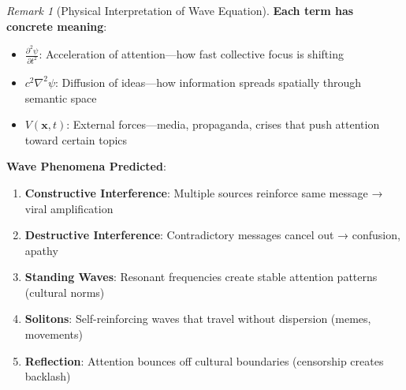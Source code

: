 \documentclass[11pt,a4paper]{article}
\theoremstyle{definition}
\theoremstyle{remark}
\newtheorem{remark}{Remark}[section]
\begin{document}
\begin{remark}[Physical Interpretation of Wave Equation]
\textbf{Each term has concrete meaning}:

\begin{itemize}
    \item \(\frac{\partial^2 \psi}{\partial t^2}\): Acceleration of attention—how fast collective focus is shifting
    \item \(c^2 \nabla^2 \psi\): Diffusion of ideas—how information spreads spatially through semantic space
    \item \(V(\mathbf{x}, t)\): External forces—media, propaganda, crises that push attention toward certain topics
\end{itemize}

\textbf{Wave Phenomena Predicted}:
\begin{enumerate}
    \item \textbf{Constructive Interference}: Multiple sources reinforce same message → viral amplification
    \item \textbf{Destructive Interference}: Contradictory messages cancel out → confusion, apathy
    \item \textbf{Standing Waves}: Resonant frequencies create stable attention patterns (cultural norms)
    \item \textbf{Solitons}: Self-reinforcing waves that travel without dispersion (memes, movements)
    \item \textbf{Reflection}: Attention bounces off cultural boundaries (censorship creates backlash)
\end{enumerate}
\end{remark}
\end{document}
